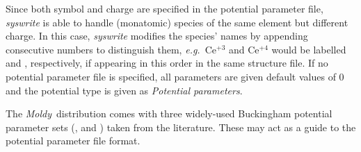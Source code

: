 \documentclass[a4paper,twoside]{report}
\newcommand{\moldy}{\emph{Moldy}}
\newcommand{\eg}{\emph{e.g.}}
\begin{document}
Since both symbol and charge are specified in the potential parameter file,
\emph{syswrite} is able to handle (monatomic) species of the same element but different charge.
In this case, \emph{syswrite} modifies the species' names by appending consecutive
numbers to distinguish them, \eg\ Ce$^{+3}$ and Ce$^{+4}$ would be labelled
 and , respectively, if appearing in this order in the same
structure file. If no potential parameter file is specified, all
parameters are given default values of 0 and the potential type is given
as \textit{Potential parameters}.

The \moldy\ distribution comes with three widely-used Buckingham potential
parameter sets (,  and
) taken from the literature. These may act as a guide
to the potential parameter file format.



\end{document}

